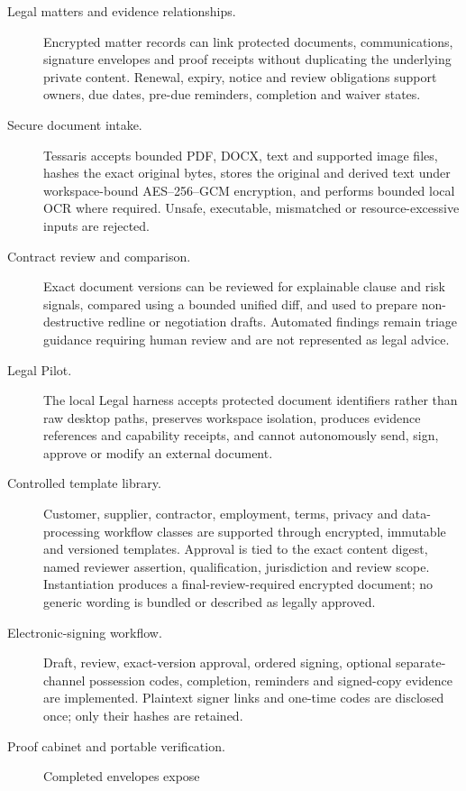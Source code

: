 \begin{description}
  \item[Legal matters and evidence relationships.] Encrypted matter records can
        link protected documents, communications, signature envelopes and proof
        receipts without duplicating the underlying private content. Renewal,
        expiry, notice and review obligations support owners, due dates,
        pre-due reminders, completion and waiver states.
  \item[Secure document intake.] Tessaris accepts bounded PDF, DOCX, text and
        supported image files, hashes the exact original bytes, stores the
        original and derived text under workspace-bound AES--256--GCM
        encryption, and performs bounded local OCR where required. Unsafe,
        executable, mismatched or resource-excessive inputs are rejected.
  \item[Contract review and comparison.] Exact document versions can be
        reviewed for explainable clause and risk signals, compared using a
        bounded unified diff, and used to prepare non-destructive redline or
        negotiation drafts. Automated findings remain triage guidance requiring
        human review and are not represented as legal advice.
  \item[Legal Pilot.] The local Legal harness accepts protected document
        identifiers rather than raw desktop paths, preserves workspace
        isolation, produces evidence references and capability receipts, and
        cannot autonomously send, sign, approve or modify an external document.
  \item[Controlled template library.] Customer, supplier, contractor,
        employment, terms, privacy and data-processing workflow classes are
        supported through encrypted, immutable and versioned templates.
        Approval is tied to the exact content digest, named reviewer assertion,
        qualification, jurisdiction and review scope. Instantiation produces a
        final-review-required encrypted document; no generic wording is bundled
        or described as legally approved.
  \item[Electronic-signing workflow.] Draft, review, exact-version approval,
        ordered signing, optional separate-channel possession codes, completion,
        reminders and signed-copy evidence are implemented. Plaintext signer
        links and one-time codes are disclosed once; only their hashes are
        retained.
  \item[Proof cabinet and portable verification.] Completed envelopes expose

\end{description}
